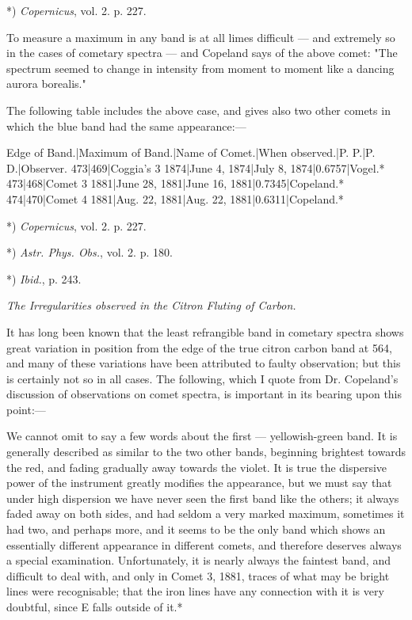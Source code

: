 \documentclass[a4paper, 12pt, oneside, polutonikogreek, english]{article}
\begin{document}
*) \emph{Copernicus}, vol. 2. p. 227.

To measure a maximum in any band is at all limes difficult --- and extremely so in the cases of cometary spectra --- and Copeland says of the above comet: "The spectrum seemed to change in intensity from moment to moment like a dancing aurora borealis."

The following table includes the above case, and gives also two other comets in which the blue band had the same appearance:---

Edge of Band.|Maximum of Band.|Name of Comet.|When observed.|P. P.|P. D.|Observer. 
473|469|Coggia's 3 1874|June 4, 1874|July 8, 1874|0.6757|Vogel.* 
473|468|Comet 3 1881|June 28, 1881|June 16, 1881|0.7345|Copeland.* 
474|470|Comet 4 1881|Aug. 22, 1881|Aug. 22, 1881|0.6311|Copeland.* 

*) \emph{Copernicus}, vol. 2. p. 227.

*) \emph{Astr. Phys. Obs.}, vol. 2. p. 180.

*) \emph{Ibid.}, p. 243.

\emph{The Irregularities observed in the Citron Fluting of Carbon.}

It has long been known that the least refrangible band in cometary spectra shows great variation in position from the edge of the true citron carbon band at 564, and many of these variations have been attributed to faulty observation; but this is certainly not so in all cases. The following, which I quote from Dr. Copeland's discussion of observations on comet spectra, is important in its bearing upon this point:---

We cannot omit to say a few words about the first --- yellowish-green band. It is generally described as similar to the two other bands, beginning brightest towards the red, and fading gradually away towards the violet. It is true the dispersive power of the instrument greatly modifies the appearance, but we must say that under high dispersion we have never seen the first band like the others; it always faded away on both sides, and had seldom a very marked maximum, sometimes it had two, and perhaps more, and it seems to be the only band which shows an essentially different appearance in different comets, and therefore deserves always a special examination. Unfortunately, it is nearly always the faintest band, and difficult to deal with, and only in Comet 3, 1881, traces of what may be bright lines were recognisable; that the iron lines have any connection with it is very doubtful, since E falls outside of it.*
\end{document}

